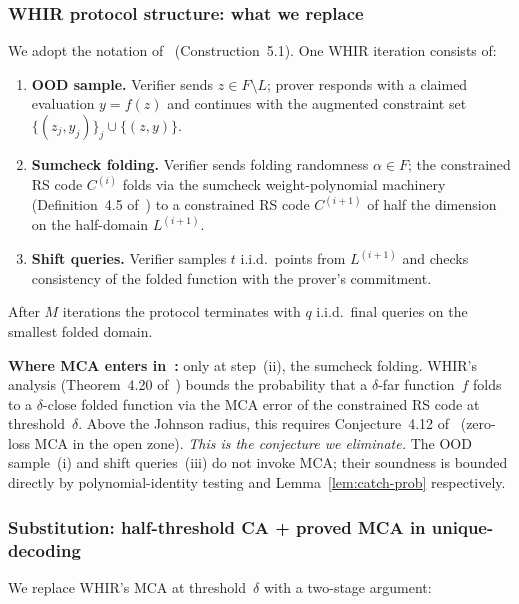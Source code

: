 \documentclass[11pt]{article}
\begin{document}
\subsubsection*{WHIR protocol structure: what we replace}

We adopt the notation of~\cite{WHIR} (Construction~5.1). One WHIR iteration consists of:

\begin{enumerate}[nosep,label=(\roman*)]
\item \textbf{OOD sample.} Verifier sends $z \in F \setminus L$; prover responds with a claimed evaluation $y = f(z)$ and continues with the augmented constraint set $\{(z_j, y_j)\}_j \cup \{(z, y)\}$.
\item \textbf{Sumcheck folding.} Verifier sends folding randomness $\alpha \in F$; the constrained RS code $C^{(i)}$ folds via the sumcheck weight-polynomial machinery (Definition~4.5 of~\cite{WHIR}) to a constrained RS code $C^{(i+1)}$ of half the dimension on the half-domain $L^{(i+1)}$.
\item \textbf{Shift queries.} Verifier samples $t$ i.i.d.\ points from $L^{(i+1)}$ and checks consistency of the folded function with the prover's commitment.
\end{enumerate}

After $M$ iterations the protocol terminates with $q$ i.i.d.\ final queries on the smallest folded domain.

\textbf{Where MCA enters in~\cite{WHIR}:} only at step~(ii), the sumcheck folding. WHIR's analysis (Theorem~4.20 of~\cite{WHIR}) bounds the probability that a $\delta$-far function~$f$ folds to a $\delta$-close folded function via the MCA error of the constrained RS code at threshold~$\delta$. Above the Johnson radius, this requires Conjecture~4.12 of~\cite{WHIR} (zero-loss MCA in the open zone). \emph{This is the conjecture we eliminate.} The OOD sample~(i) and shift queries~(iii) do not invoke MCA; their soundness is bounded directly by polynomial-identity testing and Lemma~\ref{lem:catch-prob} respectively.

\subsubsection*{Substitution: half-threshold CA + proved MCA in unique-decoding}

We replace WHIR's MCA at threshold~$\delta$ with a two-stage argument:
\end{document}
